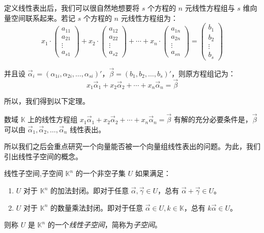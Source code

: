 定义线性表出后，我们可以很自然地想要将 $s$ 个方程的 $n$ 元线性方程组与 $s$ 维向量空间联系起来。若记 $s$ 个方程的 $n$ 元线性方程组为：
$$
x_1 \cdot \begin{pmatrix} a_{11} \\ a_{21} \\ \vdots \\ a_{s1} \end{pmatrix} +
x_2 \cdot \begin{pmatrix} a_{12} \\ a_{22} \\ \vdots \\ a_{s2} \end{pmatrix} +
\cdots +
x_n \cdot \begin{pmatrix} a_{1n} \\ a_{2n} \\ \vdots \\ a_{sn} \end{pmatrix} =
\begin{pmatrix} b_1 \\ b_2 \\ \vdots \\ b_s \end{pmatrix}
$$

并且设 $\vec \alpha_i = (\alpha_{1i}, \alpha_{2i}, \ldots, \alpha_{si})'$，$\vec \beta = (b_1, b_2, \ldots, b_s)'$，则原方程组记为：
$$
x_1 \vec \alpha_1 + x_2 \vec \alpha_2 + \cdots + x_n \vec \alpha_n = \vec \beta
$$

所以，我们得到以下定理。

\begin{theorem}
	数域 $\mathbb K$ 上的线性方程组 $x_1 \vec \alpha_1 + x_2 \vec \alpha_2 + \cdots + x_n \vec \alpha_n = \vec \beta$ 有解的充分必要条件是，$\vec \beta$ 可以由 $\vec \alpha_1, \vec \alpha_2, \ldots, \vec \alpha_n$ 线性表出。
\end{theorem}

所以我们之后会重点研究一个向量能否被一个向量组线性表出的问题。为此，我们引出线性子空间的概念。

\begin{definition}{线性子空间,子空间}
	$\mathbb K^n$ 的一个非空子集 $U$ 如果满足：
	\begin{enumerate}
		\item $U$ 对于 $\mathbb K^n$ 的加法封闭。即对于任意 $\vec \alpha, \vec \gamma \in U$，总有 $\vec \alpha + \vec \gamma \in U$。
		\item $U$ 对于 $\mathbb K^n$ 的数量乘法封闭。即对于任意 $\vec \alpha \in U, k \in \mathbb K$，总有 $k \vec \alpha \in U$。
	\end{enumerate}
	则称 $U$ 是 $\mathbb K^n$ 的一个\emph{线性子空间}，简称为\emph{子空间}。
\end{definition}

